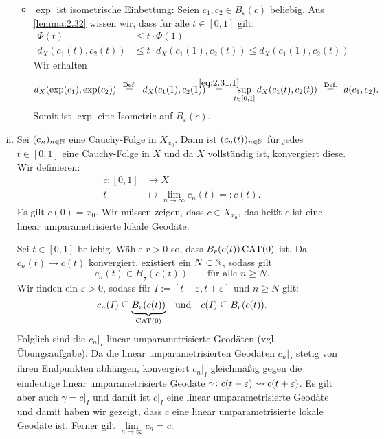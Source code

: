 \begin{beweis}
\begin{enumerate}[(i)]
\begin{itemize}
			
			\item $\exp$ ist isometrische Einbettung:
			Seien $c_1,c_2 \in B_\varepsilon(c)$ beliebig.
			Aus \autoref{lemma:2.32} wissen wir, dass für alle $t \in [0,1]$ gilt:
			\begin{align}
				\Phi(t) &\leq t \cdot \Phi(1) \\
				d_X(c_1(t),c_2(t)) &\leq t \cdot d_X(c_1(1),c_2(t)) \leq d_X(c_1(1),c_2(t)) \label{eq:2.31.1}
			\end{align}
			Wir erhalten
			\[
				d_X(\exp(c_1),\exp(c_2)) \stack{\text{Def.}}{=} d_X(c_1(1),c_2(1))  \stack{\eqref{eq:2.31.1}}{=} \sup_{t \in [0,1]} d_X(c_1(t),c_2(t)) \stack{\text{Def.}}{=} d(c_1,c_2).
			\]
			Somit ist $\exp$ eine Isometrie auf $B_\varepsilon(c)$.
		\end{itemize}
		\newpage
		\item Sei $(c_n)_{n \in \mathbb{N}}$ eine Cauchy-Folge in $\tilde{X}_{x_0}$.
		Dann ist $(c_n(t))_{n \in \mathbb{N}}$ für jedes $t \in [0,1]$ eine Cauchy-Folge in $X$ und da $X$ vollständig ist, konvergiert diese.
		Wir definieren:
		\begin{align*}
			c \colon [0,1] &\longrightarrow X \\
			t &\longmapsto \lim\limits_{n \rightarrow \infty} c_n(t) =: c(t).
		\end{align*}
		Es gilt $c(0) = x_0$.
		Wir müssen zeigen, dass $c \in \tilde{X}_{x_0}$, das heißt $c$ ist eine linear umparametrisierte lokale Geodäte.
		
		Sei $t \in [0,1]$ beliebig.
		Wähle  $r > 0$ so, dass $B_r(c(t)) \operatorname{CAT(0)}$ ist.
		Da $c_n(t) \rightarrow c(t)$ konvergiert, existiert ein $N \in \mathbb{N}$, sodass gilt
		\[
			c_n(t) \in B_{\frac{r}{2}}(c(t)) \qquad \text{für alle } n \geq N.
		\]
		Wir finden ein $\varepsilon > 0$, sodass für $I := [t- \varepsilon, t+ \varepsilon]$ und $n \geq N$ gilt:
		\[
			c_n(I) \subseteq {\underbrace{B_r(c(t))}_{\operatorname{CAT(0)}}} \quad \text{und} \quad c(I) \subseteq B_r(c(t)).
		\]
		Folglich sind die $c_n \big|_I$ linear umparametrisierte Geodäten (vgl. Übungsaufgabe).
		Da die linear umparametrisierten Geodäten $c_n \big|_I$ stetig von ihren Endpunkten abhängen, konvergiert $c_n \big|_I$ gleichmäßig gegen die eindeutige linear umparametrisierte Geodäte $\gamma \colon c(t-\varepsilon) \rightsquigarrow c(t+\varepsilon)$.
		Es gilt aber auch $\gamma = c \big|_I$ und damit ist $c \big|_I$ eine linear umparametrisierte Geodäte und damit haben wir gezeigt, dass $c$ eine linear umparametrisierte lokale Geodäte ist.
		Ferner gilt $\lim\limits_{n \rightarrow \infty} c_n = c$. \qedhere
	\end{enumerate}
\end{beweis}	

